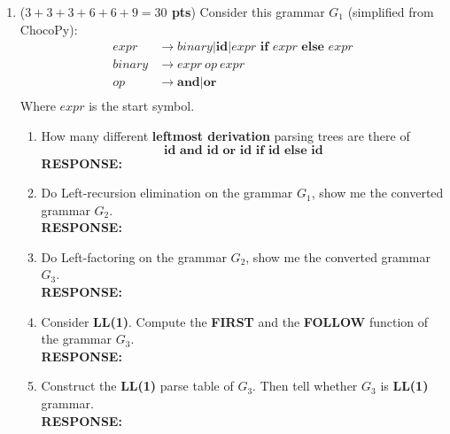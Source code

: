 \documentclass[10pt]{article}
\newcommand {\pts}[1]{({\bf #1 pts})}
\newcommand {\response}{{\color{blue}\textbf{RESPONSE:}\\}}
\begin{document}
\begin{enumerate}
	      \begin{enumerate}
	      	\item $L_1=\{ (^k)^k|k=0,1,2,3,\dots\}$\\
	      	      \response 
	      	\item $L_2=\big\{\text{All non-empty Palindrome strings over }\Sigma=\{0,1\}\big\}$\\
	      	      \response
	      	\item $L_3=L_1 + L_2=L_1\cup L_2$\\
	      	      \response
	        \item $L=\{\textbf{a}^n \textbf{b}^n \textbf{c}^m \textbf{d} | m,n \ge 0\} \cup \{\textbf{a}^n \textbf{b}^m \textbf{c}^m \textbf{e} | m,n \ge  0\}$\\	        (Note: this language is unambiguous but has not a unambiguous grammar.)
\\\response
	      \end{enumerate}
	      \newpage
	\item \pts{$3+3+3+6+6+9=30$} Consider this grammar $G_1$ (simplified from ChocoPy): 
	    $$
	    \begin{aligned}
	        expr &\to binary|\textbf{id}|expr \textbf{ if } expr \textbf{ else } expr\\
	        binary &\to expr\ op \ expr\\
	        op &\to \textbf{and} | \textbf{or}\\
	    \end{aligned}
	    $$
	    Where $expr$ is the start symbol.
	      \begin{enumerate}
	      	\item How many different \textbf{leftmost derivation} parsing trees are there of
	      	$$
	      	\textbf{id and id or id if id else id}
	      	$$\response
	      	\item Do Left-recursion elimination on the grammar $G_1$, show me the converted grammar $G_2$.\\\response
	      	\item Do Left-factoring on the grammar $G_2$, show me the converted grammar $G_3$.\\\response
	      	\item Consider \textbf{LL(1)}. Compute the \textbf{FIRST} and the \textbf{FOLLOW} function of the grammar $G_3$. \\\response
	      	\item Construct the \textbf{LL(1)} parse table of $G_3$. Then tell whether $G_3$ is \textbf{LL(1)} grammar.\\\response

\end{enumerate}
\end{enumerate}
\end{document}
